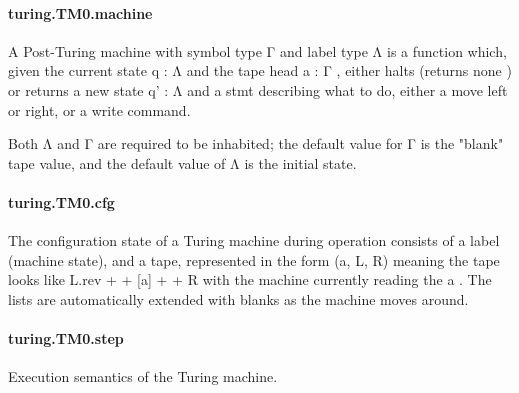 \documentclass{article}
\begin{document}
\paragraph{turing.TM0.machine}
\par
A Post-Turing machine with symbol type 
\colorbox[RGB]{253,246,227}{{{{\color[RGB]{101, 123, 131} Γ }}}} and label type 
\colorbox[RGB]{253,246,227}{{{{\color[RGB]{101, 123, 131} Λ }}}}is a function which, given the current state 
\colorbox[RGB]{253,246,227}{{{{\color[RGB]{101, 123, 131} q : Λ }}}} and
the tape head 
\colorbox[RGB]{253,246,227}{{{{\color[RGB]{101, 123, 131} a : Γ }}}}, either halts (returns 
\colorbox[RGB]{253,246,227}{{{{\color[RGB]{101, 123, 131} none }}}}) or returns
a new state 
\colorbox[RGB]{253,246,227}{{{{\color[RGB]{101, 123, 131} q' : Λ }}}} and a 
\colorbox[RGB]{253,246,227}{{{{\color[RGB]{101, 123, 131} stmt }}}} describing what to do,
either a move left or right, or a write command.
\par
Both 
\colorbox[RGB]{253,246,227}{{{{\color[RGB]{101, 123, 131} Λ }}}} and 
\colorbox[RGB]{253,246,227}{{{{\color[RGB]{101, 123, 131} Γ }}}} are required to be inhabited; the default value
for 
\colorbox[RGB]{253,246,227}{{{{\color[RGB]{101, 123, 131} Γ }}}} is the "blank" tape value, and the default value of 
\colorbox[RGB]{253,246,227}{{{{\color[RGB]{101, 123, 131} Λ }}}} is
the initial state.
\paragraph{turing.TM0.cfg}
\par
The configuration state of a Turing machine during operation
consists of a label (machine state), and a tape, represented in
the form 
\colorbox[RGB]{253,246,227}{{{{\color[RGB]{101, 123, 131} (a, L, R) }}}} meaning the tape looks like 
\colorbox[RGB]{253,246,227}{{{{\color[RGB]{101, 123, 131} L.rev  }}}{{{\color[RGB]{181, 137, 0} + }}}{{{\color[RGB]{181, 137, 0} + }}}{{{\color[RGB]{101, 123, 131}  {[}a{]}  }}}{{{\color[RGB]{181, 137, 0} + }}}{{{\color[RGB]{181, 137, 0} + }}}{{{\color[RGB]{101, 123, 131}  R }}}}with the machine currently reading the 
\colorbox[RGB]{253,246,227}{{{{\color[RGB]{101, 123, 131} a }}}}. The lists are
automatically extended with blanks as the machine moves around.
\paragraph{turing.TM0.step}
\par
Execution semantics of the Turing machine.
\end{document}
